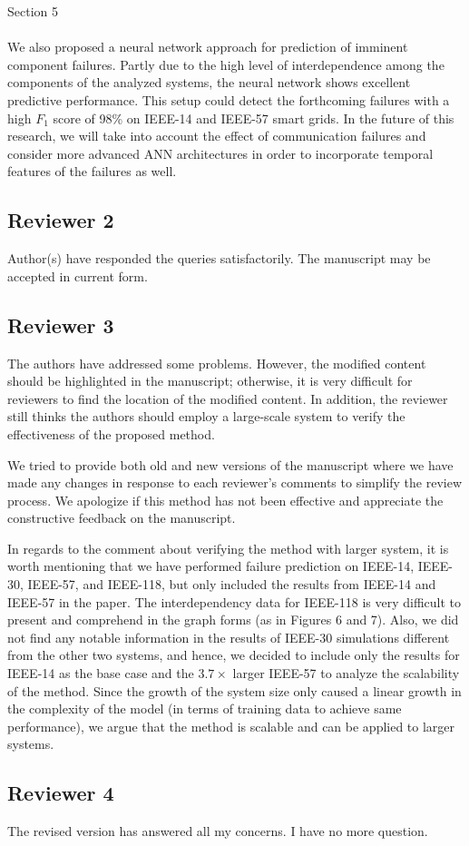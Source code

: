 \documentclass{article}
\newenvironment{response}{
  \doublespacing
  \setlength\parindent{0.05\linewidth}
  \ttfamily
}{}
\newenvironment{textblock}[1]
{\begin{tcolorbox}[breakable,enhanced]{#1 \\ \\}}
{\end{tcolorbox}}
\begin{document}
\begin{response}
\begin{textblock}{Section 5}
We also proposed a neural network approach for prediction of imminent component failures. Partly due to the high level of interdependence among the components of the analyzed systems, the neural network shows excellent predictive performance. This setup could detect the forthcoming failures with a high $F_1$ score of 98\% on IEEE-14 and IEEE-57 smart grids. In the future of this research, we will take into account the effect of communication failures and consider more advanced ANN architectures in order to incorporate temporal features of the failures as well.
\end{textblock}

\end{response}

\subsection{Reviewer 2}
\label{sec:reviewer:r2}
Author(s) have responded the queries satisfactorily. The manuscript may be accepted in current form.

\subsection{Reviewer 3}
\label{sec:reviewer:r3}
The authors have addressed some problems. However, the modified content should be highlighted in the manuscript; otherwise, it is very difficult for reviewers to find the location of the modified content. In addition, the reviewer still thinks the authors should employ a large-scale system to verify the effectiveness of the proposed method.

\begin{response}
We tried to provide both old and new versions of the manuscript where we have made any changes in response to each reviewer's comments to simplify the review process. We apologize if this method has not been effective and appreciate the constructive feedback on the manuscript.

In regards to the comment about verifying the method with larger system, it is worth mentioning that we have performed failure prediction on IEEE-14, IEEE-30, IEEE-57, and IEEE-118, but only included the results from IEEE-14 and IEEE-57 in the paper. The interdependency data for IEEE-118 is very difficult to present and comprehend in the graph forms (as in Figures 6 and 7). Also, we did not find any notable information in the results of IEEE-30 simulations different from the other two systems, and hence, we decided to include only the results for IEEE-14 as the base case and the $3.7 \times$ larger IEEE-57 to analyze the scalability of the method. Since the growth of the system size only caused a linear growth in the complexity of the model (in terms of training data to achieve same performance), we argue that the method is scalable and can be applied to larger systems.
\end{response}

\subsection{Reviewer 4}
\label{sec:reviewer:r4}
The revised version has answered all my concerns. I have no more question.
\end{document}
